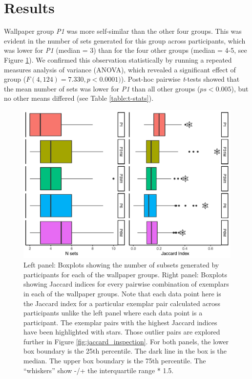 \documentclass[11pt, twoside]{article}
\begin{document}
\section*{Results}
Wallpaper group \textit{P1} was more self-similar than the other four groups. This was evident in the number of sets generated for this group across participants, which was lower for \textit{P1} (median = 3) than for the four other groups (median = 4-5, see Figure \ref{fig:n_sets_jaccard_summary}). We confirmed this observation statistically by running a repeated measures analysis of variance (ANOVA), which revealed a significant effect of group ($F(4, 124) = 7.330, p < 0.0001)$). Post-hoc pairwise \textit{t}-tests showed that the mean number of sets was lower for \textit{P1} than all other groups ($ps < 0.005$), but no other means differed (see Table \ref{table:t-stats}).
\begin{figure}[t]
	\centering
	\includegraphics[width=\linewidth]{./figures/nsets_jaccard_summary.pdf}
	\caption{Left panel: Boxplots showing the number of subsets generated by participants for each of the wallpaper groups. Right panel: Boxplots showing Jaccard indices for every pairwise combination of exemplars in each of the wallpaper groups. Note that each data point here is the Jaccard index for a particular exemplar pair calculated across participants unlike the left panel where each data point is a participant. The exemplar pairs with the highest Jaccard indices have been highlighted with stars. Those outlier pairs are explored further in Figure \ref{fig:jaccard_inspection}. For both panels, the lower box boundary is the 25th percentile. The dark line in the box is the median. The upper box boundary is the 75th percentile. The “whiskers” show -/+ the interquartile range * 1.5. }
	\label{fig:n_sets_jaccard_summary}
\end{figure}
\end{document}
